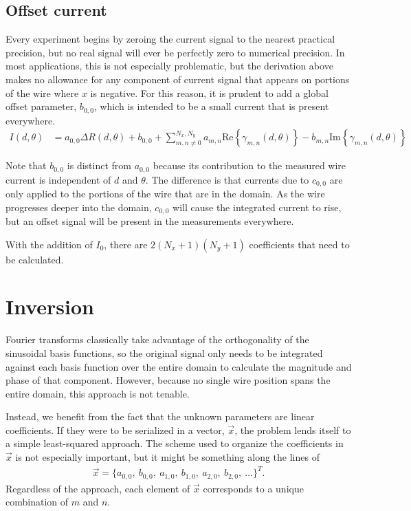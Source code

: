 \documentclass{article}
\def\real{\mathrm{Re}}
\def\imag{\mathrm{Im}}
\begin{document}
\subsection{Offset current}

Every experiment begins by zeroing the current signal to the nearest practical precision, but no real signal will ever be perfectly zero to numerical precision.  In most applications, this is not especially problematic, but the derivation above makes no allowance for any component of current signal that appears on portions of the wire where $x$ is negative.  For this reason, it is prudent to add a global offset parameter, $b_{0,0}$, which is intended to be a small current that is present everywhere.  
\begin{align}
I(d,\theta) &= a_{0,0} \Delta R(d,\theta) + b_{0,0} + \sum_{m,n\ne 0}^{N_x,N_y} a_{m,n} \real \left\{ \gamma_{m,n}(d,\theta) \right\} - b_{m,n} \imag \left\{ \gamma_{m,n}(d,\theta) \right\} \label{eqn:I}
\end{align}

Note that $b_{0,0}$ is distinct from $a_{0,0}$ because its contribution to the measured wire current is independent of $d$ and $\theta$.  The difference is that currents due to $c_{0,0}$ are only applied to the portions of the wire that are in the domain.  As the wire progresses deeper into the domain, $c_{0,0}$ will cause the integrated current to rise, but an offset signal will be present in the measurements everywhere.

With the addition of $I_0$, there are $2(N_x+1)(N_y+1)$ coefficients that need to be calculated.

\section{Inversion}

Fourier transforms classically take advantage of the orthogonality of the sinusoidal basis functions, so the original signal only needs to be integrated against each basis function over the entire domain to calculate the magnitude and phase of that component.  However, because no single wire position spans the entire domain, this approach is not tenable.

Instead, we benefit from the fact that the unknown parameters are linear coefficients.  If they were to be serialized in a vector, $\vec{x}$, the problem lends itself to a simple least-squared approach.  The scheme used to organize the coefficients in $\vec{x}$ is not especially important, but it might be something along the lines of 
\begin{align}
\vec{x} = \{a_{0,0},\ b_{0,0},\ a_{1,0},\ b_{1,0},\ a_{2,0},\ b_{2,0},\ \ldots \}^T.
\end{align}
Regardless of the approach, each element of $\vec{x}$ corresponds to a unique combination of $m$ and $n$.  
\end{document}
